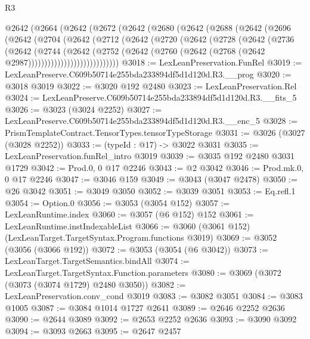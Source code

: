 \begin{lexlean}{R3}
\begin{coremodule}
  @2642
    (@2664
      (@2642
        (@2672
          (@2642
            (@2680
              (@2642
                (@2688
                  (@2642
                    (@2696
                      (@2642
                        (@2704
                          (@2642
                            (@2712
                              (@2642
                                (@2720
                                  (@2642
                                    (@2728
                                      (@2642
                                        (@2736
                                          (@2642
                                            (@2744
                                              (@2642
                                                (@2752
                                                  (@2642
                                                    (@2760
                                                      (@2642
                                                        (@2768
                                                          (@2642 @2987))))))))))))))))))))))))))))
@3018 := LexLeanPreservation.FunRel
@3019 := LexLeanPreserve.C609b50714e255bda233894df5d1d120d.R3.__prog
@3020 := @3018 @3019
@3022 := @3020 @192 @2480
@3023 := LexLeanPreservation.Rel
@3024 := LexLeanPreserve.C609b50714e255bda233894df5d1d120d.R3.__fits_5
@3026 := @3023 (@3024 @2252)
@3027 := LexLeanPreserve.C609b50714e255bda233894df5d1d120d.R3.__enc_5
@3028 := PrismTemplateContract.TensorTypes.tensorTypeStorage
@3031 := @3026 (@3027 (@3028 @2252))
@3033 := (typeId : @17) -> @3022 @3031
@3035 := LexLeanPreservation.funRel_intro @3019
@3039 := @3035 @192 @2480 @3031 @1729
@3042 := Prod.{0, 0} @17 @2246
@3043 := @2 @3042
@3046 := Prod.mk.{0, 0} @17 @2246
@3047 := @3046 @159
@3049 := @3043 (@3047 @2478)
@3050 := @26 @3042
@3051 := @3049 @3050
@3052 := @3039 @3051
@3053 := Eq.refl.{1}
@3054 := Option.{0}
@3056 := @3053 (@3054 @152)
@3057 := LexLeanRuntime.index
@3060 := @3057 (@6 @152) @152
@3061 := LexLeanRuntime.instIndexableList
@3066 := @3060 (@3061 @152) (LexLeanTarget.TargetSyntax.Program.functions @3019)
@3069 := @3052 (@3056 (@3066 @192))
@3072 := @3053 (@3054 (@6 @3042))
@3073 := LexLeanTarget.TargetSemantics.bindAll
@3074 := LexLeanTarget.TargetSyntax.Function.parameters
@3080 := @3069 (@3072 (@3073 (@3074 @1729) @2480 @3050))
@3082 := LexLeanPreservation.conv_cond @3019
@3083 := @3082 @3051
@3084 := @3083 @1005
@3087 := @3084 @1014 @1727 @2641
@3089 := @2646 @2252 @2636
@3090 := @2644 @3089
@3092 := @2653 @2252 @2636
@3093 := @3090 @3092
@3094 := @3093 @2663
@3095 := @2647 @2457

\end{coremodule}
\end{lexlean}
